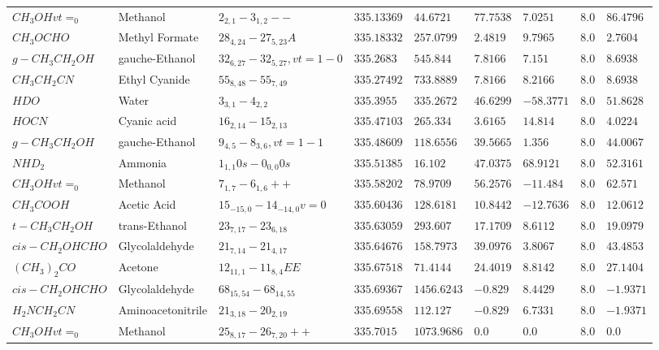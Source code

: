 \documentclass{aa}
\begin{document}
\begin{table}
\begin{tabular}{l l l l l l l l l}
$CH_{3}OHvt=_{0}$ & Methanol & $2_{2,1}-3_{1,2}--$ & $335.13369$ & $44.6721$ & $77.7538$ & $7.0251$ & $8.0$ & $86.4796$\\
$CH_{3}OCHO$ & Methyl Formate & $28_{4,24}-27_{5,23}A$ & $335.18332$ & $257.0799$ & $2.4819$ & $9.7965$ & $8.0$ & $2.7604$\\
$g-CH_{3}CH_{2}OH$ & gauche-Ethanol & $32_{6,27}-32_{5,27},vt=1-0$ & $335.2683$ & $545.844$ & $7.8166$ & $7.151$ & $8.0$ & $8.6938$\\
$CH_{3}CH_{2}CN$ & Ethyl Cyanide & $55_{8,48}-55_{7,49}$ & $335.27492$ & $733.8889$ & $7.8166$ & $8.2166$ & $8.0$ & $8.6938$\\
$HDO$ & Water & $3_{3,1}-4_{2,2}$ & $335.3955$ & $335.2672$ & $46.6299$ & $-58.3771$ & $8.0$ & $51.8628$\\
$HOCN$ & Cyanic acid & $16_{2,14}-15_{2,13}$ & $335.47103$ & $265.334$ & $3.6165$ & $14.814$ & $8.0$ & $4.0224$\\
$g-CH_{3}CH_{2}OH$ & gauche-Ethanol & $9_{4,5}-8_{3,6},vt=1-1$ & $335.48609$ & $118.6556$ & $39.5665$ & $1.356$ & $8.0$ & $44.0067$\\
$NHD_{2}$ & Ammonia & $1_{1,1}0s-0_{0,0}0s$ & $335.51385$ & $16.102$ & $47.0375$ & $68.9121$ & $8.0$ & $52.3161$\\
$CH_{3}OHvt=_{0}$ & Methanol & $7_{1,7}-6_{1,6}++$ & $335.58202$ & $78.9709$ & $56.2576$ & $-11.484$ & $8.0$ & $62.571$\\
$CH_{3}COOH$ & Acetic Acid & $15_{-15,0}-14_{-14,0}v=0$ & $335.60436$ & $128.6181$ & $10.8442$ & $-12.7636$ & $8.0$ & $12.0612$\\
$t-CH_{3}CH_{2}OH$ & trans-Ethanol & $23_{7,17}-23_{6,18}$ & $335.63059$ & $293.607$ & $17.1709$ & $8.6112$ & $8.0$ & $19.0979$\\
$cis-CH_{2}OHCHO$ & Glycolaldehyde & $21_{7,14}-21_{4,17}$ & $335.64676$ & $158.7973$ & $39.0976$ & $3.8067$ & $8.0$ & $43.4853$\\
$(CH_{3})_{2}CO$ & Acetone & $12_{11,1}-11_{8,4}EE$ & $335.67518$ & $71.4144$ & $24.4019$ & $8.8142$ & $8.0$ & $27.1404$\\
$cis-CH_{2}OHCHO$ & Glycolaldehyde & $68_{15,54}-68_{14,55}$ & $335.69367$ & $1456.6243$ & $-0.829$ & $8.4429$ & $8.0$ & $-1.9371$\\
$H_{2}NCH_{2}CN$ & Aminoacetonitrile & $21_{3,18}-20_{2,19}$ & $335.69558$ & $112.127$ & $-0.829$ & $6.7331$ & $8.0$ & $-1.9371$\\
$CH_{3}OHvt=_{0}$ & Methanol & $25_{8,17}-26_{7,20}++$ & $335.7015$ & $1073.9686$ & $0.0$ & $0.0$ & $8.0$ & $0.0$\\

\end{tabular}
\end{table}
\end{document}
